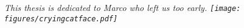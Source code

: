 \thispagestyle{empty}
\begin{flushright}
\vspace*{\fill}
\emph{%
	This thesis is dedicated to Marco who left us too early.
	\texttt{[image: figures/cryingcatface.pdf]}%
}
\vspace*{\fill}
\vspace*{\fill}
\vspace*{\fill}
\end{flushright}
\fi
